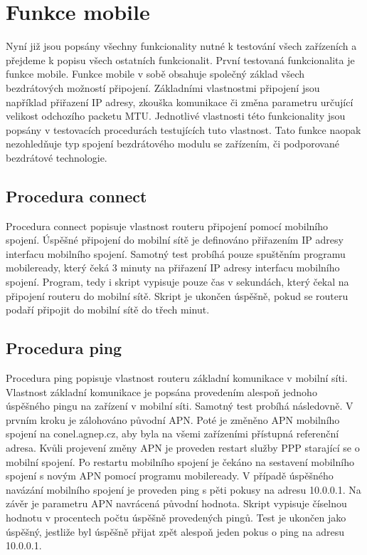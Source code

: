 \section{Funkce mobile}
Nyní již jsou popsány všechny funkcionality nutné k testování všech zařízeních a přejdeme k popisu všech ostatních funkcionalit. První testovaná funkcionalita je funkce mobile. Funkce mobile v sobě obsahuje společný základ všech bezdrátových možností připojení. Základními vlastnostmi připojení jsou například přiřazení IP adresy, zkouška komunikace či změna parametru určující velikost odchozího packetu MTU. Jednotlivé vlastnosti této funkcionality jsou popsány v testovacích procedurách testujících tuto vlastnost. Tato funkce naopak nezohledňuje typ spojení bezdrátového modulu se zařízením, či podporované bezdrátové technologie.

\subsection{Procedura connect}
Procedura connect popisuje vlastnost routeru připojení pomocí mobilního spojení. Úspěšné připojení do mobilní sítě je definováno přiřazením IP adresy interfacu mobilního spojení. Samotný test probíhá pouze spuštěním programu mobileready, který čeká 3 minuty na přiřazení IP adresy interfacu mobilního spojení. Program, tedy i skript vypisuje pouze čas v sekundách, který čekal na připojení routeru do mobilní sítě. Skript je ukončen úspěšně, pokud se routeru podaří připojit do mobilní sítě do třech minut.

\subsection{Procedura ping}
Procedura ping popisuje vlastnost routeru základní komunikace v mobilní síti. Vlastnost základní komunikace je popsána provedením alespoň jednoho úspěšného pingu na zařízení v mobilní síti. Samotný test probíhá následovně. V prvním kroku je zálohováno původní APN. Poté je změněno APN mobilního spojení na conel.agnep.cz, aby byla na všemi zařízeními přístupná referenční adresa. Kvůli projevení změny APN je proveden restart služby PPP starající se o mobilní spojení. Po restartu mobilního spojení je čekáno na sestavení mobilního spojení s novým APN pomocí programu mobileready. V případě úspěšného navázání mobilního spojení je proveden ping s pěti pokusy na adresu 10.0.0.1. Na závěr je parametru APN navrácená původní hodnota. Skript vypisuje číselnou hodnotu v procentech počtu úspěšně provedených pingů. Test je ukončen jako úspěšný, jestliže byl úspěšně přijat zpět alespoň jeden pokus o ping na adresu 10.0.0.1.

